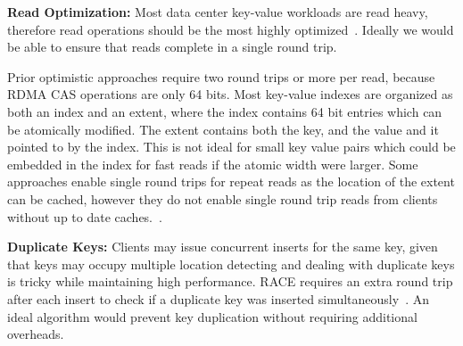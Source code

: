 
\textbf{Read Optimization:} Most data center key-value
workloads are read heavy, therefore read operations should
be the most highly
optimized~\cite{datacenter-workloads,facebook-memcached}.
Ideally we would be able to ensure that reads complete in a
single round trip.

Prior optimistic approaches require two round trips or more
per read, because RDMA CAS operations are only 64 bits. Most
key-value indexes are organized as both an index and an
extent, where the index contains 64 bit entries which can be
atomically modified. The extent contains both the key, and
the value and it pointed to by the index. This is not ideal
for small key value pairs which could be embedded in the
index for fast reads if the atomic width were larger. Some
approaches enable single round trips for repeat reads as the
location of the extent can be cached, however they do not
enable single round trip reads from clients without up to
date caches.~\cite{clover}.



\textbf{Duplicate Keys:} Clients may issue concurrent
inserts for the same key, given that keys may occupy
multiple location detecting and dealing with duplicate keys
is tricky while maintaining high performance. RACE requires
an extra round trip after each insert to check if a
duplicate key was inserted simultaneously~\cite{race}. An
ideal algorithm would prevent key duplication without
requiring additional overheads.